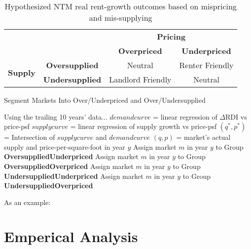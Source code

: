 \documentclass[sn-mathphys-num]{sn-jnl}%
\theoremstyle{thmstyleone}%
\theoremstyle{thmstyletwo}%
\theoremstyle{thmstylethree}%
\begin{document}
\begin{table}[h!]
\centering
\begin{tabular}{cc|c|c|}
\multicolumn{2}{c}{} & \multicolumn{2}{c}{\textbf{Pricing}} \\
\multicolumn{2}{c}{} & \textbf{Overpriced} & \textbf{Underpriced} \\
\cmidrule{3-4}
\multirow{2}{*}{\textbf{Supply}} & \textbf{Oversupplied} & Neutral & Renter Friendly \\\cmidrule{2-4}
 & \textbf{Undersupplied} & Landlord Friendly & Neutral \\
\bottomrule
\end{tabular}
\caption{Hypothesized NTM real rent-growth outcomes based on mispricing and mis-supplying}
\end{table}


\begin{algorithm}
	\caption{Segment Markets Into Over/Underpriced and Over/Undersupplied}\label{alg:market_segmentation}
	\begin{algorithmic}[1]
		        \State Using the trailing 10 years' data...
		        \State $demandcurve$ = linear regression of  $\Delta\text{RDI}$  vs price-psf
		        \State $supplycurve$ = linear regression of supply growth vs price-psf
		        \State $(q^*, p^*)$ = Intersection of $supplycurve$ and $demandcurve$
		        \State $(q, p)$ = market's actual supply and price-per-square-foot in year $y$
		                \State Assign market $m$ in year $y$ to Group \textbf{OversuppliedUnderpriced}
		            \Else
		                \State Assign market $m$ in year $y$ to Group \textbf{OversuppliedOverpriced}
		            \EndIf
		        \Else
		                \State Assign market $m$ in year $y$ to Group \textbf{UndersuppliedUnderpriced}
		            \Else
		                \State Assign market $m$ in year $y$ to Group \textbf{UndersuppliedOverpriced}
		            \EndIf
		        \EndIf
		    \EndFor
		\EndFor
	\end{algorithmic}
\end{algorithm}


As an example:





\section{Emperical Analysis}
\end{document}
